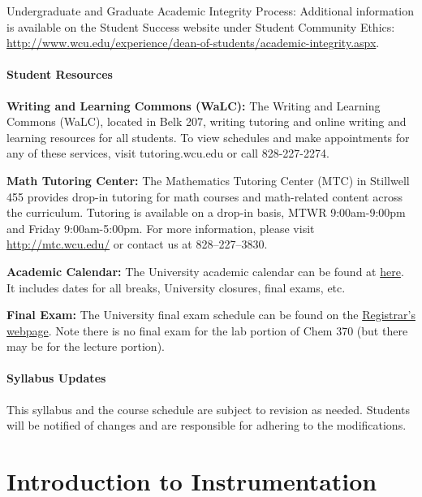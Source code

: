 \documentclass[]{tufte-book}
\begin{document}
Undergraduate and Graduate Academic Integrity Process: Additional information is available on the Student Success website under Student Community Ethics: \url{http://www.wcu.edu/experience/dean-of-students/academic-integrity.aspx}.

\hypertarget{student-resources}{%
\subsection*{Student Resources}\label{student-resources}}

\textbf{Writing and Learning Commons (WaLC):} The Writing and Learning Commons (WaLC), located in Belk 207, writing tutoring and online writing and learning resources for all students. To view schedules and make appointments for any of these services, visit tutoring.wcu.edu or call 828-227-2274.

\textbf{Math Tutoring Center:} The Mathematics Tutoring Center (MTC) in Stillwell 455 provides drop-in tutoring for math courses and math-related content across the curriculum. Tutoring is available on a drop-in basis, MTWR 9:00am-9:00pm and Friday 9:00am-5:00pm. For more information, please visit \url{http://mtc.wcu.edu/} or contact us at 828--227--3830.

\textbf{Academic Calendar:} The University academic calendar can be found at \href{http://www.wcu.edu/learn/academic-calendar.aspx}{here}. It includes dates for all breaks, University closures, final exams, etc.

\textbf{Final Exam:} The University final exam schedule can be found on the \href{http://www.wcu.edu/learn/academic-services/registrars-office/}{Registrar's webpage}. Note there is no final exam for the lab portion of Chem 370 (but there may be for the lecture portion).

\hypertarget{syllabus-updates}{%
\subsection*{Syllabus Updates}\label{syllabus-updates}}

This syllabus and the course schedule are subject to revision as needed. Students will be notified of changes and are responsible for adhering to the modifications.

\hypertarget{part-introduction-to-instrumentation}{%
\part{Introduction to Instrumentation}\label{part-introduction-to-instrumentation}}
\end{document}
